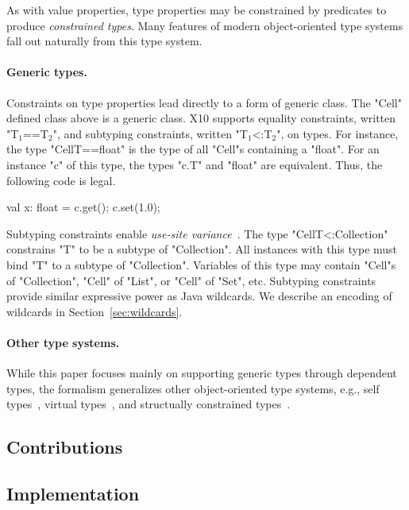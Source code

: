 As with value properties, type properties may be constrained
by predicates to produce \emph{constrained types}.
Many features of modern object-oriented type systems fall out
naturally from this type system.

\paragraph{Generic types.}
Constraints on type properties lead directly to a form of generic class.
The \xcd"Cell" defined class above is a generic class.
X10 supports
equality constraints, written \xcdmath"T$_1$==T$_2$", and
subtyping constraints, written \xcdmath"T$_1$<:T$_2$", on types.
For instance,
the type \xcd"Cell{T==float}" is the type of all \xcd"Cell"s
containing a \xcd"float".  For an instance \xcd"c" of this type,
the types \xcd"c.T" and \xcd"float" are equivalent.  Thus, the
following code is legal.
\begin{xten}
val x: float = c.get();
c.set(1.0);
\end{xten}

Subtyping constraints enable \emph{use-site variance}~\cite{variance}.
The type \xcd"Cell{T<:Collection}"
constrains \xcd"T" to be a subtype of \xcd"Collection".
All instances with this type must bind \xcd"T" to a subtype of
\xcd"Collection".
Variables of this type may contain \xcd"Cell"s of
\xcd"Collection", \xcd"Cell" of \xcd"List",
or \xcd"Cell" of \xcd"Set", etc.
Subtyping constraints provide similar expressive power as Java
wildcards.  We describe an encoding of wildcards in
Section~\ref{sec:wildcards}. 

\paragraph{Other type systems.}

While this paper focuses mainly on supporting generic types 
through dependent types, the formalism generalizes 
other object-oriented type systems, e.g., self
types~\cite{bruce-binary,bsg95}, virtual
types~\cite{mp89-virtual-classes,beta,ernst06-virtual},
and structually constrained
types~\cite{polyj,haskell-type-classes}.

\subsection{Contributions}


\subsection{Implementation}

